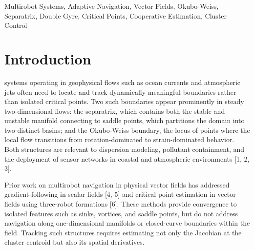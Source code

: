 \documentclass[lettersize,journal]{IEEEtran}
\begin{document}
\begin{IEEEkeywords}
Multirobot Systems, Adaptive Navigation, Vector Fields, Okubo-Weiss, Separatrix,
Double Gyre, Critical Points, Cooperative Estimation, Cluster Control
\end{IEEEkeywords}


\section{Introduction}
\label{sec:intro}

 systems operating in geophysical flows such as ocean currents and
atmospheric jets often need to locate and track dynamically meaningful boundaries
rather than isolated critical points. Two such boundaries appear prominently in
steady two-dimensional flows: the separatrix, which contains both the stable and unstable manifold connecting to saddle points, which partitions the domain into two distinct basins; and the
Okubo-Weiss boundary, the locus of points where the local flow transitions from
rotation-dominated to strain-dominated behavior. Both structures are relevant to
dispersion modeling, pollutant containment, and the deployment of sensor networks
in coastal and atmospheric environments [1, 2, 3].

Prior work on multirobot navigation in physical vector fields has addressed
gradient-following in scalar fields [4, 5] and critical point estimation in
vector fields using three-robot formations [6]. These methods provide convergence
to isolated features such as sinks, vortices, and saddle points, but do not
address navigation along one-dimensional manifolds or closed-curve boundaries
within the field. Tracking such structures requires estimating not only the
Jacobian at the cluster centroid but also its spatial derivatives.
\end{document}
